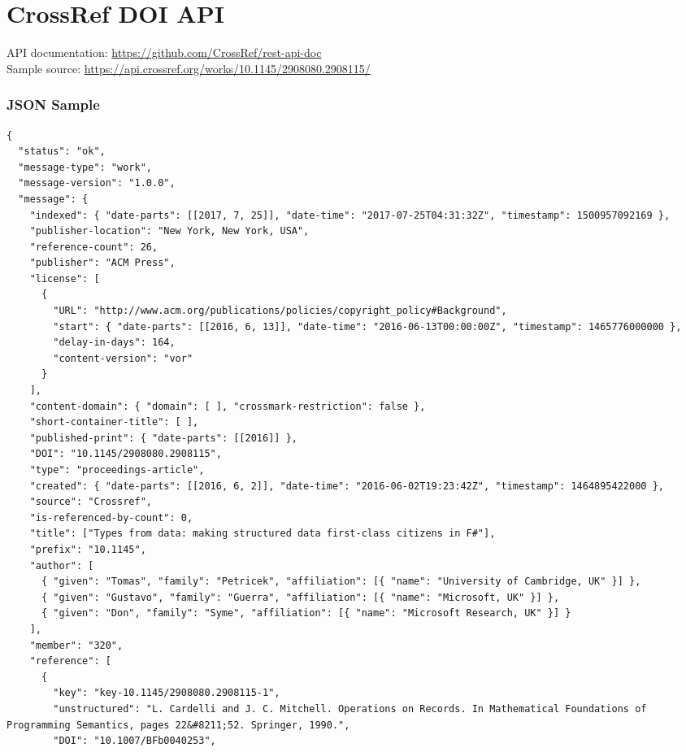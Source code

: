 \section{CrossRef DOI API}
\label{app:crossref}

API documentation: \url{https://github.com/CrossRef/rest-api-doc} \\
Sample source: \url{https://api.crossref.org/works/10.1145/2908080.2908115/}

\subsubsection{JSON Sample}

\begin{multicols}{2}
\begin{verbatim}
{
  "status": "ok",
  "message-type": "work",
  "message-version": "1.0.0",
  "message": {
    "indexed": { "date-parts": [[2017, 7, 25]], "date-time": "2017-07-25T04:31:32Z", "timestamp": 1500957092169 },
    "publisher-location": "New York, New York, USA",
    "reference-count": 26,
    "publisher": "ACM Press",
    "license": [
      {
        "URL": "http://www.acm.org/publications/policies/copyright_policy#Background",
        "start": { "date-parts": [[2016, 6, 13]], "date-time": "2016-06-13T00:00:00Z", "timestamp": 1465776000000 },
        "delay-in-days": 164,
        "content-version": "vor"
      }
    ],
    "content-domain": { "domain": [ ], "crossmark-restriction": false },
    "short-container-title": [ ],
    "published-print": { "date-parts": [[2016]] },
    "DOI": "10.1145/2908080.2908115",
    "type": "proceedings-article",
    "created": { "date-parts": [[2016, 6, 2]], "date-time": "2016-06-02T19:23:42Z", "timestamp": 1464895422000 },
    "source": "Crossref",
    "is-referenced-by-count": 0,
    "title": ["Types from data: making structured data first-class citizens in F#"],
    "prefix": "10.1145",
    "author": [
      { "given": "Tomas", "family": "Petricek", "affiliation": [{ "name": "University of Cambridge, UK" }] },
      { "given": "Gustavo", "family": "Guerra", "affiliation": [{ "name": "Microsoft, UK" }] },
      { "given": "Don", "family": "Syme", "affiliation": [{ "name": "Microsoft Research, UK" }] }
    ],
    "member": "320",
    "reference": [
      {
        "key": "key-10.1145/2908080.2908115-1",
        "unstructured": "L. Cardelli and J. C. Mitchell. Operations on Records. In Mathematical Foundations of Programming Semantics, pages 22&#8211;52. Springer, 1990.",
        "DOI": "10.1007/BFb0040253",

\end{verbatim}
\end{multicols}
